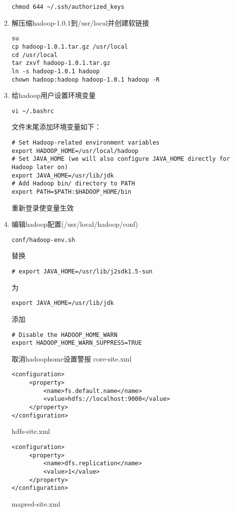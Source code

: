 \begin{enumerate}
\begin{verbatim}
chmod 644 ~/.ssh/authorized_keys
\end{verbatim}
\item 解压缩hadoop-1.0.1到/usr/local并创建软链接

\begin{verbatim}
su
cp hadoop-1.0.1.tar.gz /usr/local
cd /usr/local
tar zxvf hadoop-1.0.1.tar.gz
ln -s hadoop-1.0.1 hadoop
chown hadoop:hadoop hadoop-1.0.1 hadoop -R
\end{verbatim}
\item 给hadoop用户设置环境变量

\begin{verbatim}
vi ~/.bashrc
\end{verbatim}
文件末尾添加环境变量如下：

\begin{verbatim}
# Set Hadoop-related environment variables
export HADOOP_HOME=/usr/local/hadoop
# Set JAVA_HOME (we will also configure JAVA_HOME directly for Hadoop later on)
export JAVA_HOME=/usr/lib/jdk
# Add Hadoop bin/ directory to PATH
export PATH=$PATH:$HADOOP_HOME/bin
\end{verbatim}
重新登录使变量生效
\item 编辑hadoop配置(/usr/local/hadoop/conf)

\begin{verbatim}
conf/hadoop-env.sh
\end{verbatim}
替换

\begin{verbatim}
# export JAVA_HOME=/usr/lib/j2sdk1.5-sun
\end{verbatim}
为

\begin{verbatim}
export JAVA_HOME=/usr/lib/jdk
\end{verbatim}
添加

\begin{verbatim}
# Disable the HADOOP_HOME_WARN
export HADOOP_HOME_WARN_SUPPRESS=TRUE
\end{verbatim}
取消hadoophome设置警报
core-site.xml 

\begin{verbatim}
<configuration>
     <property>
         <name>fs.default.name</name>
         <value>hdfs://localhost:9000</value>
     </property>
</configuration>
\end{verbatim}
hdfs-site.xml 

\begin{verbatim}
<configuration>
     <property>
         <name>dfs.replication</name>
         <value>1</value>
     </property>
</configuration>
\end{verbatim}
mapred-site.xml 


\end{enumerate}
